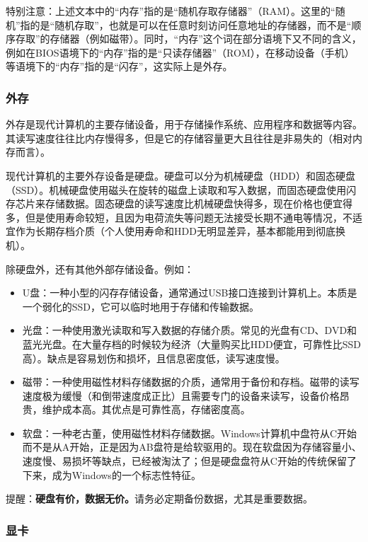 \documentclass[../main.tex]{subfiles}
\begin{document}
特别注意：上述文本中的“内存”指的是“随机存取存储器”（RAM）。这里的“随机”指的是“随机存取”，也就是可以在任意时刻访问任意地址的存储器，而不是“顺序存取”的存储器（例如磁带）。同时，“内存”这个词在部分语境下又不同的含义，例如在BIOS语境下的“内存”指的是“只读存储器”（ROM），在移动设备（手机）等语境下的“内存”指的是“闪存”，这实际上是外存。

\subsubsection{外存}

外存是现代计算机的主要存储设备，用于存储操作系统、应用程序和数据等内容。其读写速度往往比内存慢得多，但是它的存储容量更大且往往是非易失的（相对内存而言）。

现代计算机的主要外存设备是硬盘。硬盘可以分为机械硬盘（HDD）和固态硬盘（SSD）。机械硬盘使用磁头在旋转的磁盘上读取和写入数据，而固态硬盘使用闪存芯片来存储数据。固态硬盘的读写速度比机械硬盘快得多，现在价格也便宜得多，但是使用寿命较短，且因为电荷流失等问题无法接受长期不通电等情况，不适宜作为长期存档介质（个人使用寿命和HDD无明显差异，基本都能用到彻底换机）。

除硬盘外，还有其他外部存储设备。例如：
\begin{itemize}
    \item U盘：一种小型的闪存存储设备，通常通过USB接口连接到计算机上。本质是一个弱化的SSD，它可以临时地用于存储和传输数据。
    \item 光盘：一种使用激光读取和写入数据的存储介质。常见的光盘有CD、DVD和蓝光光盘。在大量存档的时候较为经济（大量购买比HDD便宜，可靠性比SSD高）。缺点是容易划伤和损坏，且信息密度低，读写速度慢。
    \item 磁带：一种使用磁性材料存储数据的介质，通常用于备份和存档。磁带的读写速度极为缓慢（和倒带速度成正比）且需要专门的设备来读写，设备价格昂贵，维护成本高。其优点是可靠性高，存储密度高。
    \item 软盘：一种老古董，使用磁性材料存储数据。Windows计算机中盘符从C开始而不是从A开始，正是因为AB盘符是给软驱用的。现在软盘因为存储容量小、速度慢、易损坏等缺点，已经被淘汰了；但是硬盘盘符从C开始的传统保留了下来，成为Windows的一个标志性特征。
\end{itemize}

提醒：\textbf{硬盘有价，数据无价。}请务必定期备份数据，尤其是重要数据。

\subsubsection{显卡}
\end{document}
